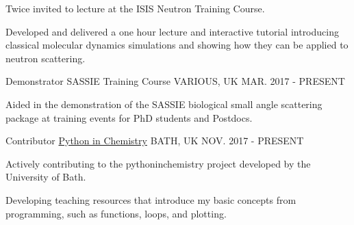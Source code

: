 \begin{cventries}
{\begin{cvitems}
			\item {Twice invited to lecture at the ISIS Neutron Training Course.}
			\item {Developed and delivered a one hour lecture and interactive tutorial introducing classical molecular dynamics simulations and showing how they can be applied to neutron scattering.}
		\end{cvitems}
	}
	\cventry
	{Demonstrator}
	{SASSIE Training Course}
	{VARIOUS, UK}
	{MAR. 2017 - PRESENT}
	{
		\begin{cvitems}
			\item {Aided in the demonstration of the SASSIE biological small angle scattering package at training events for PhD students and Postdocs.}
		\end{cvitems}
	}
	\cventry
	{Contributor}
	{\href{http://blogs.bath.ac.uk/python/}{Python in Chemistry}}
	{BATH, UK}
	{NOV. 2017 - PRESENT}
	{
		\begin{cvitems}
			\item {Actively contributing to the pythoninchemistry project developed by the University of Bath.}
			\item {Developing teaching resources that introduce my basic concepts from programming, such as functions, loops, and plotting.}
		\end{cvitems}
	}
\end{cventries}
